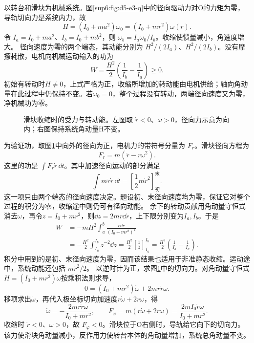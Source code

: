 \begin{solution}
以转台和滑块为机械系统。图\ref{sup6:fig:d5-e3-q}中的径向驱动力对O的力矩为零，导轨切向力是系统内力，故
\[
H=(I_0+ma^2)\omega_0=(I_0+mr^2)\omega(r).
\]
令 $I_a=I_0+ma^2$、$I_b=I_0+mb^2$，则 $\omega_b=I_a\omega_0/I_b$。收缩使惯量减小，角速度增大。
径向速度为零的两个端态，其动能分别为 $H^2/(2I_a)$、$H^2/(2I_b)$。没有摩擦耗散，电机向机械运动输入的功为
\[
W=\frac{H^2}{2}\left(\frac1{I_b}-\frac1{I_a}\right)\ge0.
\]
初始有转动时$H\ne0$，上式严格为正，收缩所增加的转动能由电机供给；轴向角动量在此过程中仍保持不变。若$\omega_0=0$，整个过程没有转动，两端径向速度又为零，净机械功为零。
\begin{figure}[H]\centering
{}
\caption{滑块收缩时的受力与转动能。左图取 $\dot r<0$、$\omega>0$，径向力示意为向内；右图保持系统角动量H不变。}\label{sup6:fig:d5-e3-s}
\end{figure}
为验证功，取图\ref{sup6:fig:d5-e3-s}中向外的径向为正，电机力的带符号分量为 $F_r$。滑块径向方程为
\[
F_r=m(\ddot r-r\omega^2).
\]
这里的功是 $\int F_r\dot r\,\dd t$。其中加速径向运动的部分满足
\[
\int m\ddot r\dot r\,\dd t
=\left[\frac12m\dot r^2\right]_{\text{初}}^{\text{末}}.
\]
这一项只由两个端态的径向速度决定。题设初、末径向速度均为零，保证它对整个过程的积分为零，收缩途中则仍可有径向动能。
余下的转动贡献用角动量守恒式消去$\omega$，再令$z=I_0+mr^2$，则$\dd z=2mr\dd r$，上下限分别变为$I_a,I_b$。于是
\[
\begin{aligned}
W&=-mH^2\int_a^b\frac{r\dd r}{(I_0+mr^2)^2}\\
&=-\frac{H^2}{2}\int_{I_a}^{I_b}z^{-2}\dd z
=\frac{H^2}{2}\left[\frac1z\right]_{I_a}^{I_b}
=\frac{H^2}{2}\left(\frac1{I_b}-\frac1{I_a}\right).
\end{aligned}
\]
积分中用到的是初、末径向速度为零，因而该结果也适用于非准静态收缩。运动途中，系统动能还包括 $m\dot r^2/2$。
以逆时针为正，求图\ref{sup6:fig:d5-e3-s}中的切向力。对角动量守恒式$H=(I_0+mr^2)\omega$按乘积法则求导，
\[
0=(I_0+mr^2)\dot\omega+2mr\dot r\omega.
\]
移项求出$\dot\omega$，再代入极坐标切向加速度$r\dot\omega+2\dot r\omega$，得
\[
\dot\omega=-\frac{2mr\dot r\omega}{I_0+mr^2},\qquad
F_\varphi=m(r\dot\omega+2\dot r\omega)
=\frac{2mI_0\dot r\omega}{I_0+mr^2}.
\]
收缩时 $\dot r<0$、$\omega>0$，故 $F_\varphi<0$。滑块位于O右侧时，导轨给它向下的切向力。该力使滑块角动量减小，反作用力使转台本体的角动量增加，系统总角动量不变。
\end{solution}



